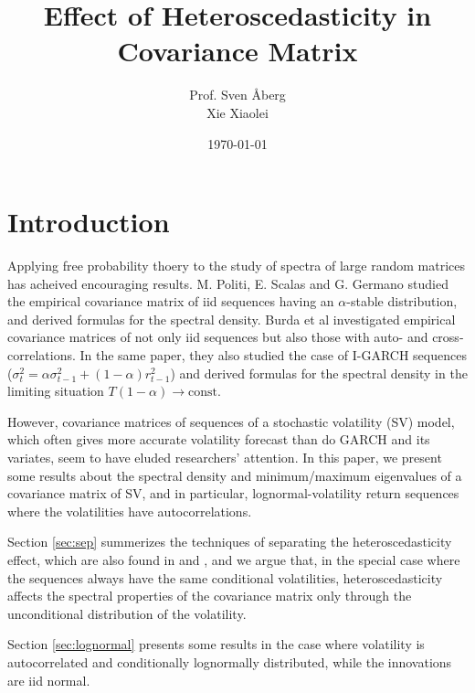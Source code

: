 \documentclass{article}
\author{
  Prof. Sven \AA berg \\
  Xie Xiaolei}
\date{\today}
\title{Effect of Heteroscedasticity in Covariance Matrix}
\begin{document}
\maketitle

\section{Introduction}
Applying free probability thoery to the study of spectra of large
random matrices has acheived encouraging results. M. Politi, E. Scalas
and G. Germano \cite{politi2010} studied the empirical covariance
matrix of iid sequences having an $\alpha$-stable distribution, and
derived formulas for the spectral density. Burda et al
\cite{burda2011} investigated empirical covariance matrices of not
only iid sequences but also those with auto- and
cross-correlations. In the same paper, they also studied the case of
I-GARCH sequences ($\sigma^2_t = \alpha \sigma^2_{t-1} + (1 - \alpha)
r^2_{t-1}$) and derived formulas for the spectral density in the
limiting situation $T(1-\alpha) \to \text{const}$.

However, covariance matrices of sequences of a stochastic volatility
(SV) model, which often gives more accurate volatility forecast than
do GARCH and its variates, seem to have eluded researchers'
attention. In this paper, we present some results about the spectral
density and minimum/maximum eigenvalues of a covariance matrix of SV,
and in particular, lognormal-volatility return sequences where the
volatilities have autocorrelations.

Section \ref{sec:sep} summerizes the techniques of separating the
heteroscedasticity effect, which are also found in
\cite{biroli2007student} and \cite{burda2011}, and we argue that, in
the special case where the sequences always have the same
conditional volatilities, heteroscedasticity affects the spectral
properties of the covariance matrix only through the unconditional
distribution of the volatility.

Section \ref{sec:lognormal} presents some results in the case where
volatility is autocorrelated and conditionally lognormally
distributed, while the innovations are iid normal.
\end{document}
